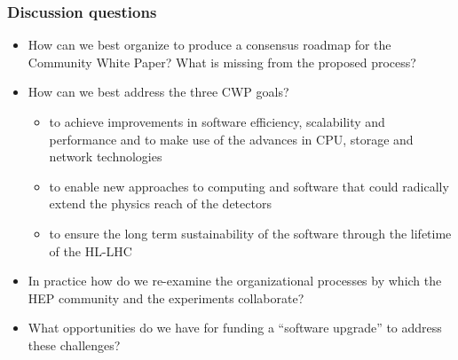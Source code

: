 \begin{frame}
\frametitle{Discussion questions}

\begin{itemize}
\item How can we best organize to produce a consensus roadmap for the Community White Paper? What is missing from the proposed process?
\item How can we best address the three CWP goals?
   \begin{itemize}
   \item to achieve improvements in software efficiency, scalability and performance and to make use of the advances in CPU, storage and network technologies
   \item to enable new approaches to computing and software that could radically extend the physics reach of the detectors
   \item to ensure the long term sustainability of the software through the lifetime of the HL-LHC
   \end{itemize}
\item In practice how do we re-examine the organizational processes by which the HEP community and the experiments collaborate?
\item What opportunities do we have for funding a ``software upgrade'' to address these challenges?
\end{itemize}



\end{frame}


